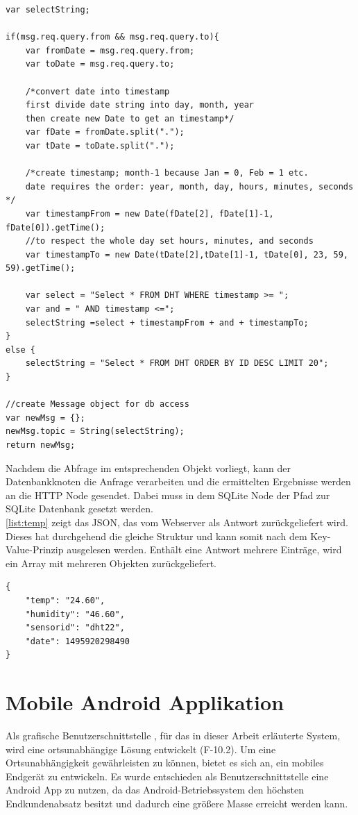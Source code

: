 \begin{lstlisting}[label=list:tempInt, caption={Funktion Node-RED tempInt}]
var selectString;

if(msg.req.query.from && msg.req.query.to){
	var fromDate = msg.req.query.from;
	var toDate = msg.req.query.to;
	
	/*convert date into timestamp
	first divide date string into day, month, year 
	then create new Date to get an timestamp*/
	var fDate = fromDate.split("."); 
	var tDate = toDate.split(".");
	
	/*create timestamp; month-1 because Jan = 0, Feb = 1 etc.
	date requires the order: year, month, day, hours, minutes, seconds */
	var timestampFrom = new Date(fDate[2], fDate[1]-1, fDate[0]).getTime();
	//to respect the whole day set hours, minutes, and seconds
	var timestampTo = new Date(tDate[2],tDate[1]-1, tDate[0], 23, 59, 59).getTime();
	
	var select = "Select * FROM DHT WHERE timestamp >= "; 
	var and = " AND timestamp <=";
	selectString =select + timestampFrom + and + timestampTo;
}
else {
	selectString = "Select * FROM DHT ORDER BY ID DESC LIMIT 20";
}

//create Message object for db access
var newMsg = {};
newMsg.topic = String(selectString);
return newMsg;
\end{lstlisting}

Nachdem die Abfrage im entsprechenden Objekt vorliegt, kann der Datenbankknoten die Anfrage verarbeiten und die ermittelten Ergebnisse werden an die \ac{HTTP} Node gesendet. Dabei muss in dem SQLite Node der Pfad zur SQLite Datenbank gesetzt werden.
\\\autoref{list:temp}  zeigt das \ac{JSON}, das vom Webserver als Antwort zurückgeliefert wird. Dieses hat durchgehend die gleiche Struktur und kann somit nach dem Key-Value-Prinzip ausgelesen werden. Enthält eine Antwort mehrere Einträge, wird ein Array mit mehreren Objekten zurückgeliefert.
\begin{lstlisting}[label=list:temp, caption={Beispiel: JSON Response für den Pfad: /temp}]
{
	"temp": "24.60",
	"humidity": "46.60",
	"sensorid": "dht22",
	"date": 1495920298490
}
\end{lstlisting}


\section{Mobile Android Applikation}
Als grafische Benutzerschnittstelle , für das in dieser Arbeit erläuterte System, wird eine ortsunabhängige Lösung entwickelt (F-10.2). Um eine Ortsunabhängigkeit gewährleisten zu können, bietet es sich an, ein mobiles Endgerät zu entwickeln. Es wurde  entschieden als Benutzerschnittstelle eine Android App zu nutzen, da das Android-Betriebssystem den höchsten Endkundenabsatz besitzt \cite{statista:marktanteileandroid} und dadurch eine größere Masse erreicht werden kann.

